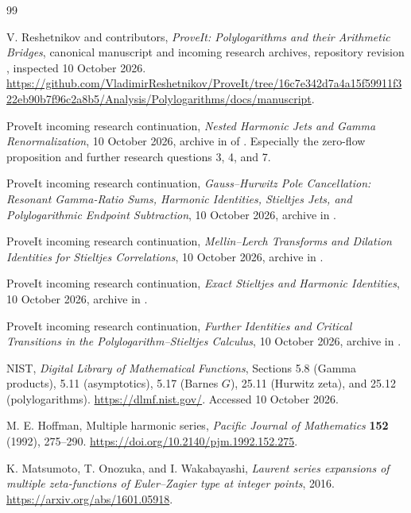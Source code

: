 \begin{thebibliography}{99}

V. Reshetnikov and contributors,
\emph{ProveIt: Polylogarithms and their Arithmetic Bridges}, canonical
manuscript and incoming research archives, repository revision
, inspected
10 October 2026.
\url{https://github.com/VladimirReshetnikov/ProveIt/tree/16c7e342d7a4a15f59911f322eb90b7f96c2a8b5/Analysis/Polylogarithms/docs/manuscript}.

ProveIt incoming research continuation,
\emph{Nested Harmonic Jets and Gamma Renormalization},
10 October 2026, archive
 in 
of \cite{repo}. Especially the zero-flow proposition and further
research questions 3, 4, and 7.

ProveIt incoming research continuation,
\emph{Gauss--Hurwitz Pole Cancellation: Resonant Gamma-Ratio Sums,
Harmonic Identities, Stieltjes Jets, and Polylogarithmic Endpoint
Subtraction}, 10 October 2026, archive
 in \cite{repo}.

ProveIt incoming research continuation,
\emph{Mellin--Lerch Transforms and Dilation Identities for Stieltjes
Correlations}, 10 October 2026, archive
 in \cite{repo}.

ProveIt incoming research continuation,
\emph{Exact Stieltjes and Harmonic Identities}, 10 October 2026,
archive 
in \cite{repo}.

ProveIt incoming research continuation,
\emph{Further Identities and Critical Transitions in the
Polylogarithm--Stieltjes Calculus}, 10 October 2026, archive
in \cite{repo}.

NIST, \emph{Digital Library of Mathematical Functions},
Sections 5.8 (Gamma products), 5.11 (asymptotics), 5.17 (Barnes $G$),
25.11 (Hurwitz zeta), and 25.12 (polylogarithms).
\url{https://dlmf.nist.gov/}. Accessed 10 October 2026.

M. E. Hoffman, Multiple harmonic series,
\emph{Pacific Journal of Mathematics} \textbf{152} (1992), 275--290.
\url{https://doi.org/10.2140/pjm.1992.152.275}.

K. Matsumoto, T. Onozuka, and I. Wakabayashi,
\emph{Laurent series expansions of multiple zeta-functions of
Euler--Zagier type at integer points}, 2016.
\url{https://arxiv.org/abs/1601.05918}.


\end{thebibliography}
